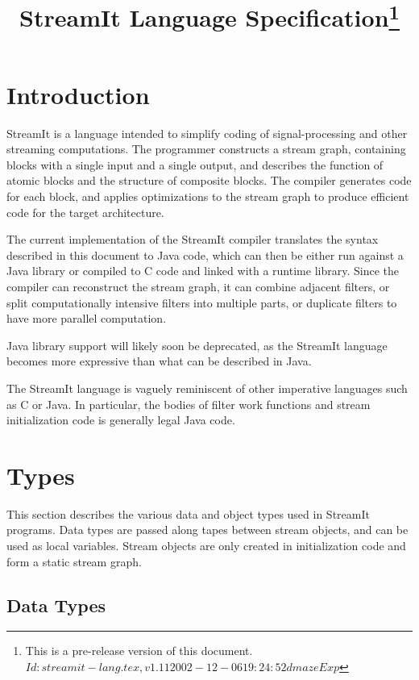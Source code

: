 \documentclass[11pt]{article}
\title{StreamIt Language Specification\thanks{
This is a pre-release version of this document.\hfil\break\ttfamily
\hbox{$Id: streamit-lang.tex,v 1.11 2002-12-06 19:24:52 dmaze Exp $}
}}
\begin{document}
\maketitle
\tableofcontents

\section{Introduction}

StreamIt is a language intended to simplify coding of
signal-processing and other streaming computations.  The programmer
constructs a stream graph, containing blocks with a single input and a
single output, and describes the function of atomic blocks and the
structure of composite blocks.  The compiler generates code for each
block, and applies optimizations to the stream graph to produce
efficient code for the target architecture.

The current implementation of the StreamIt compiler translates the
syntax described in this document to Java code, which can then be
either run against a Java library or compiled to C code and linked
with a runtime library.  Since the compiler can reconstruct the stream
graph, it can combine adjacent filters, or split computationally
intensive filters into multiple parts, or duplicate filters to have
more parallel computation.

\begin{note}
Java library support will likely soon be deprecated, as the StreamIt
language becomes more expressive than what can be described in Java.
\end{note}

The StreamIt language is vaguely reminiscent of other imperative
languages such as C or Java.  In particular, the bodies of filter work
functions and stream initialization code is generally legal Java
code.

\section{Types}

This section describes the various data and object types used in
StreamIt programs.  Data types are passed along tapes between stream
objects, and can be used as local variables.  Stream objects are only
created in initialization code and form a static stream graph.

\subsection{Data Types}
\end{document}
